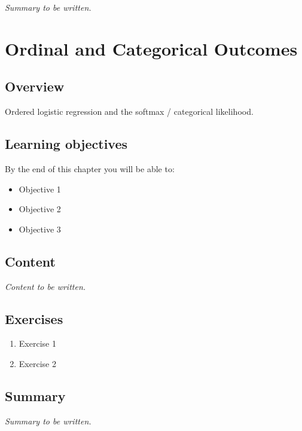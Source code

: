 \documentclass[
  11pt,
  a4paper,
  oneside,
  openany]{scrbook}
\providecommand{\tightlist}{%
  \setlength{\itemsep}{0pt}\setlength{\parskip}{0pt}}\usepackage{longtable,booktabs,array}
\begin{document}
\emph{Summary to be written.}

\chapter{Ordinal and Categorical
Outcomes}\label{ordinal-and-categorical-outcomes}

\section{Overview}\label{overview-11}

Ordered logistic regression and the softmax / categorical likelihood.

\section{Learning objectives}\label{learning-objectives-11}

By the end of this chapter you will be able to:

\begin{itemize}
\tightlist
\item[$\square$]
  Objective 1
\item[$\square$]
  Objective 2
\item[$\square$]
  Objective 3
\end{itemize}

\section{Content}\label{content-10}

\emph{Content to be written.}

\section{Exercises}\label{exercises-11}

\begin{enumerate}
\def\labelenumi{\arabic{enumi}.}
\tightlist
\item
  Exercise 1
\item
  Exercise 2
\end{enumerate}

\section{Summary}\label{summary-11}

\emph{Summary to be written.}
\end{document}
